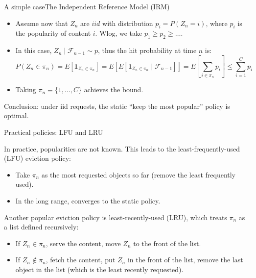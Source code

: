 \documentclass[aspectratio=169]{beamer}
\newcommand{\E}[1]{E\left[#1 \right]}
\newcommand{\ind}[1]{\mathbf{1}_{#1}}
\newenvironment*{myitem}[1][1.5em]{\begin{itemize}\setlength{\itemsep}{#1}}{\end{itemize}}
\begin{document}
\begin{frame}{A simple case}{The Independent Reference Model (IRM)}

  \begin{myitem}
    \item Assume now that $Z_n$ are $iid$ with distribution $p_i = P(Z_n=i)$, where $p_i$ is the \alert{popularity} of content $i$. Wlog, we take $p_1\geqslant p_2 \geqslant \ldots$.
    \item In this case, $Z_n\mid \mathcal{F}_{n-1} \sim p$, thus the hit probability at time $n$ is:
    \begin{equation*}
      P(Z_n \in \pi_n) = \E{\ind{Z_n\in\pi_n}} = \E{\E{\ind{Z_n\in \pi_n} \mid \mathcal{F}_{n-1}}} = \E{\sum_{i\in\pi_n} p_i} \leqslant \sum_{i=1}^C p_i
    \end{equation*}

    \item Taking $\pi_n \equiv \{1,\ldots,C\}$ achieves the bound.
    
  \end{myitem}
  \pause

  \vfill

  \alert{Conclusion:} under iid requests, the static ``keep the most popular'' policy is optimal.

\end{frame}

\begin{frame}{Practical policies: LFU and LRU}

  In practice, popularities are not known. This leads to the \alert{least-frequently-used (LFU)} eviction policy:
  \smallskip
  \begin{itemize}
    \item Take $\pi_n$ as the most requested objects so far (remove the least frequently used).
    \item In the long range, converges to the static policy.
  \end{itemize}

  \vfill

  Another popular eviction policy is \alert{least-recently-used (LRU)}, which treats $\pi_n$ as a list defined recursively:
  \smallskip
  \begin{itemize}
    \item If $Z_n \in \pi_n$, serve the content, move $Z_n$ to the front of the list.
    \item If $Z_n \notin \pi_n$, fetch the content, put $Z_n$ in the front of the list, remove the last object in the list (which is the least recently requested).
  \end{itemize}

\end{frame}
\end{document}
